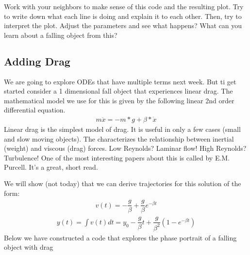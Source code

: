 \documentclass[letterpaper,10pt,english]{jupyterBook}
\begin{document}
\sphinxAtStartPar
Work with your neighbors to make sense of this code and the resulting plot. Try to write down what each line is doing and explain it to each other. Then, try to interpret the plot. Adjust the parameters and see what happens? What can you learn about a falling object from this?


\subsection{Adding Drag}
\label{\detokenize{content/2_oscillations/activity-SHO_and_dynamical_systems:adding-drag}}
\sphinxAtStartPar
We are going to explore ODEs that have multiple terms next week. But ti get started consider a 1 dimensional fall object that experiences linear drag. The mathematical model we use for this is given by the following linear 2nd order differential equation.
\begin{equation*}
\begin{split}m\ddot{x} = -m*g + \beta*\dot{x}\end{split}
\end{equation*}
\sphinxAtStartPar
Linear drag is the simplest model of drag. It is useful in only a few cases (small and slow moving objects). The  characterizes the relationship between inertial (weight) and viscous (drag) forces. Low Reynolds? Laminar flow! High Reynolds? Turbulence! One of the most interesting papers about this is called  by E.M. Purcell. It’s a great, short read.

\sphinxAtStartPar
We will show (not today) that we can derive trajectories for this solution of the form:
\begin{equation*}
\begin{split}v(t) = -\dfrac{g}{\beta}+\dfrac{g}{\beta} e^{-\beta t}\end{split}
\end{equation*}\begin{equation*}
\begin{split}y(t) = \int v(t) dt = y_0 - \dfrac{g}{\beta}t + \dfrac{g}{\beta^2}\left(1-e^{-\beta t}\right)\end{split}
\end{equation*}
\sphinxAtStartPar
Below we have constructed a code that explores the phase portrait of a falling object with drag
\end{document}
